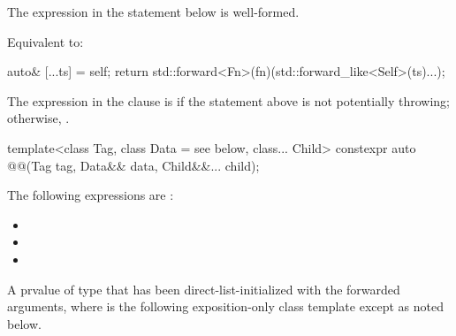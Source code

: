 \begin{itemdescr}
\pnum
\constraints
The expression in the  statement below is well-formed.

\pnum
\effects
Equivalent to:
\begin{codeblock}
auto& [...ts] = self;
return std::forward<Fn>(fn)(std::forward_like<Self>(ts)...);
\end{codeblock}

\pnum
\remarks
The expression in the  clause is 
if the  statement above is not potentially throwing;
otherwise, .
\end{itemdescr}

\begin{itemdecl}
template<class Tag, class Data = see below, class... Child>
  constexpr auto @@(Tag tag, Data&& data, Child&&... child);
\end{itemdecl}

\begin{itemdescr}
\pnum
\mandates
The following expressions are :
\begin{itemize}
\item {}
\item {}
\item {}
\end{itemize}

\pnum
\returns
A prvalue of
type 
that has been direct-list-initialized with the forwarded arguments,
where  is the following exposition-only class template except as noted below.
\end{itemdescr}

